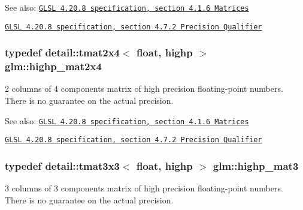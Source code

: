 \begin{Desc}
\item[See also:]\href{http://www.opengl.org/registry/doc/GLSLangSpec.4.20.8.pdf}{\tt GLSL 4.20.8 specification, section 4.1.6 Matrices} 

\href{http://www.opengl.org/registry/doc/GLSLangSpec.4.20.8.pdf}{\tt GLSL 4.20.8 specification, section 4.7.2 Precision Qualifier} \end{Desc}
\hypertarget{group__core__precision_g3cc506666b7a95db56f9d2eb787b6e20}{
\subsubsection[highp\_\-mat2x4]{\setlength{\rightskip}{0pt plus 5cm}typedef detail::tmat2x4$<$ float, highp $>$ {\bf glm::highp\_\-mat2x4}}}
\label{group__core__precision_g3cc506666b7a95db56f9d2eb787b6e20}


2 columns of 4 components matrix of high precision floating-point numbers. There is no guarantee on the actual precision.

\begin{Desc}
\item[See also:]\href{http://www.opengl.org/registry/doc/GLSLangSpec.4.20.8.pdf}{\tt GLSL 4.20.8 specification, section 4.1.6 Matrices} 

\href{http://www.opengl.org/registry/doc/GLSLangSpec.4.20.8.pdf}{\tt GLSL 4.20.8 specification, section 4.7.2 Precision Qualifier} \end{Desc}
\hypertarget{group__core__precision_g334034520a655db41a2e188951f6aaad}{
\subsubsection[highp\_\-mat3]{\setlength{\rightskip}{0pt plus 5cm}typedef detail::tmat3x3$<$ float, highp $>$ {\bf glm::highp\_\-mat3}}}
\label{group__core__precision_g334034520a655db41a2e188951f6aaad}


3 columns of 3 components matrix of high precision floating-point numbers. There is no guarantee on the actual precision.

